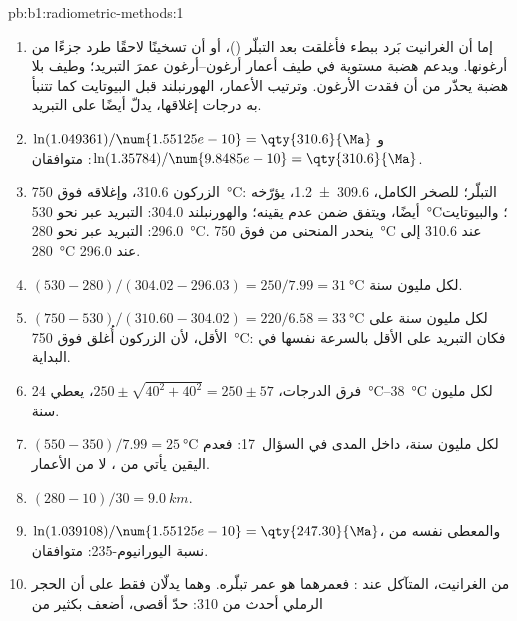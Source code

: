 \begin{solution}{pb:b1:radiometric-methods:1}
\begin{enumerate}
        العمر.   تحبس قليلًا جدًّا من الأرغون حين تتكوّن.
  \item إما أن الغرانيت بَرد ببطء فأغلقت   بعد التبلّر ()، أو أن تسخينًا لاحقًا طرد جزءًا من أرغونها. ويدعم هضبة مستوية في طيف أعمار أرغون–أرغون عمرَ التبريد؛ وطيف بلا هضبة يحذّر من أن  فقدت الأرغون. وترتيب الأعمار، الهورنبلند قبل البيوتايت كما تتنبأ به درجات إغلاقها، يدلّ أيضًا على التبريد.
  \item $\ln(1.049361)/\num{1.55125e-10} = \qty{310.6}{\Ma}$ و
        $\ln(1.35784)/\num{9.8485e-10} = \qty{310.6}{\Ma}$: متوافقان.
  \item الزركون \qty{310.6}{\Ma}، وإغلاقه فوق \qty{750}{\celsius}: التبلّر؛  للصخر الكامل،
        \qty[uncertainty-mode=separate]{309.6(12)}{\Ma}، يؤرّخه أيضًا، ويتفق ضمن عدم يقينه؛ والهورنبلند \qty{304.0}{\Ma}: التبريد
        عبر نحو \qty{530}{\celsius}؛ والبيوتايت \qty{296.0}{\Ma}: التبريد عبر نحو
        \qty{280}{\celsius}. ينحدر المنحنى من فوق \qty{750}{\celsius} عند \qty{310.6}{\Ma} إلى \qty{280}{\celsius} عند \qty{296.0}{\Ma}.
  \item $(530 - 280)/(304.02 - 296.03) = 250/7.99 = \qty{31}{\celsius}$ لكل
        مليون سنة.
  \item $(750 - 530)/(310.60 - 304.02) = 220/6.58 = \qty{33}{\celsius}$ لكل
        مليون سنة على الأقل، لأن الزركون أُغلق فوق
        \qty{750}{\celsius}: فكان التبريد على الأقل بالسرعة نفسها في البداية.
  \item فرق الدرجات، $250 \pm \sqrt{40^2 + 40^2} = 250 \pm
        57$، يعطي \qtyrange{24}{38}{\celsius} لكل مليون سنة.
  \item $(550 - 350)/7.99 = \qty{25}{\celsius}$ لكل مليون سنة، داخل المدى
        في السؤال~17: فعدم اليقين يأتي من ، لا من الأعمار.
  \item $(280 - 10)/30 = \qty{9.0}{km}$.
  \item $\ln(1.039108)/\num{1.55125e-10} = \qty{247.30}{\Ma}$، والمعطى نفسه من نسبة
        اليورانيوم-235: متوافقان.
  \item من الغرانيت، المتآكل عند : فعمرهما هو عمر تبلّره. وهما
        يدلّان فقط على أن الحجر الرملي أحدث من \qty{310}{\Ma}: حدّ أقصى، أضعف بكثير من

\end{enumerate}
\end{solution}

